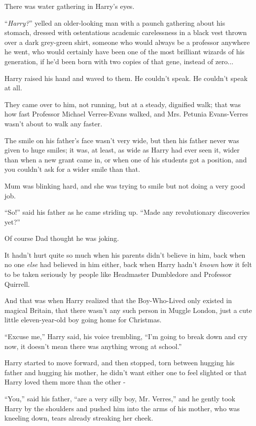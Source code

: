 There was water gathering in Harry's eyes.

``\emph{Harry?}'' yelled an older-looking man with a paunch gathering about his stomach, dressed with ostentatious academic carelessness in a black vest thrown over a dark grey-green shirt, someone who would always be a professor anywhere he went, who would certainly have been one of the most brilliant wizards of his generation, if he'd been born with two copies of that gene, instead of zero...

Harry raised his hand and waved to them. He couldn't speak. He couldn't speak at all.

They came over to him, not running, but at a steady, dignified walk; that was how fast Professor Michael Verres-Evans walked, and Mrs. Petunia Evans-Verres wasn't about to walk any faster.

The smile on his father's face wasn't very wide, but then his father never was given to huge smiles; it was, at least, as wide as Harry had ever seen it, wider than when a new grant came in, or when one of his students got a position, and you couldn't ask for a wider smile than that.

Mum was blinking hard, and she was trying to smile but not doing a very good job.

``So!'' said his father as he came striding up. ``Made any revolutionary discoveries yet?''

Of course Dad thought he was joking.

It hadn't hurt quite so much when his parents didn't believe in him, back when no one \emph{else} had believed in him either, back when Harry hadn't \emph{known} how it felt to be taken seriously by people like Headmaster Dumbledore and Professor Quirrell.

And that was when Harry realized that the Boy-Who-Lived only existed in magical Britain, that there wasn't any such person in Muggle London, just a cute little eleven-year-old boy going home for Christmas.

``Excuse me,'' Harry said, his voice trembling, ``I'm going to break down and cry now, it doesn't mean there was anything wrong at school.''

Harry started to move forward, and then stopped, torn between hugging his father and hugging his mother, he didn't want either one to feel slighted or that Harry loved them more than the other -

``You,'' said his father, ``are a very silly boy, Mr. Verres,'' and he gently took Harry by the shoulders and pushed him into the arms of his mother, who was kneeling down, tears already streaking her cheek.

